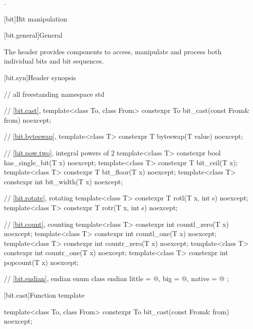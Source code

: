 \begin{itemdescr}
\pnum
\ensures
{}.
\end{itemdescr}

[bit]{Bit manipulation}

[bit.general]{General}

\pnum
The header  provides components to access,
manipulate and process both individual bits and bit sequences.

[bit.syn]{Header  synopsis}

\begin{codeblock}
// all freestanding
namespace std {
  // \ref{bit.cast}, 
  template<class To, class From>
    constexpr To bit_cast(const From& from) noexcept;

  // \ref{bit.byteswap}, 
  template<class T>
    constexpr T byteswap(T value) noexcept;

  // \ref{bit.pow.two}, integral powers of 2
  template<class T>
    constexpr bool has_single_bit(T x) noexcept;
  template<class T>
    constexpr T bit_ceil(T x);
  template<class T>
    constexpr T bit_floor(T x) noexcept;
  template<class T>
    constexpr int bit_width(T x) noexcept;

  // \ref{bit.rotate}, rotating
  template<class T>
    constexpr T rotl(T x, int s) noexcept;
  template<class T>
    constexpr T rotr(T x, int s) noexcept;

  // \ref{bit.count}, counting
  template<class T>
    constexpr int countl_zero(T x) noexcept;
  template<class T>
    constexpr int countl_one(T x) noexcept;
  template<class T>
    constexpr int countr_zero(T x) noexcept;
  template<class T>
    constexpr int countr_one(T x) noexcept;
  template<class T>
    constexpr int popcount(T x) noexcept;

  // \ref{bit.endian}, endian
  enum class endian {
    little = @\seebelow@,
    big    = @\seebelow@,
    native = @\seebelow@
  };
}
\end{codeblock}

[bit.cast]{Function template }

%
\begin{itemdecl}
template<class To, class From>
  constexpr To bit_cast(const From& from) noexcept;
\end{itemdecl}

